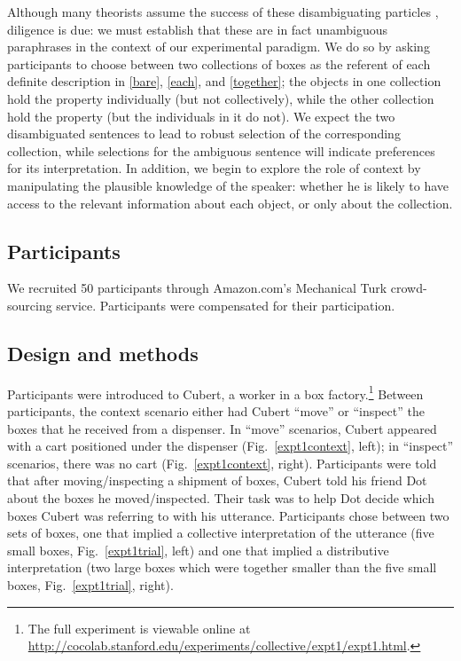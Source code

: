 \documentclass[preprint,12pt,authoryear,titlepage]{elsarticle}
\begin{document}
Although many theorists assume the success of these disambiguating particles \citep[e.g.,][]{schwarzschild1994}, diligence is due: we must establish that these are in fact unambiguous paraphrases in the context of our experimental paradigm. We do so by asking participants to choose between two collections of boxes as the referent of each definite description in \ref{bare}, \ref{each}, and \ref{together}; the objects in one collection hold the property individually (but not collectively), while the other collection hold the property (but the individuals in it do not).
We expect the two disambiguated sentences to lead to robust selection of the corresponding collection, while selections for the ambiguous sentence will indicate preferences for its interpretation.
In addition, we begin to explore the role of context by manipulating the plausible knowledge of the speaker: whether he is likely to have access to the relevant information about each object, or only about the collection.

\subsection{Participants}

We recruited 50 participants through Amazon.com's Mechanical Turk crowd-sourcing service. Participants were compensated for their participation.


\subsection{Design and methods}

Participants were introduced to Cubert, a worker in a box factory.\footnote{The full experiment is viewable online at \url{http://cocolab.stanford.edu/experiments/collective/expt1/expt1.html}.} Between participants, the context scenario either had Cubert ``move'' or ``inspect'' the boxes that he received from a dispenser. In ``move'' scenarios, Cubert appeared with a cart positioned under the dispenser (Fig.~\ref{expt1context}, left); in ``inspect'' scenarios, there was no cart (Fig.~\ref{expt1context}, right). Participants were told that after moving/inspecting a shipment of boxes, Cubert told his friend Dot about the boxes he moved/inspected. Their task was to help Dot decide which boxes Cubert was referring to with his utterance. Participants chose between two sets of boxes, one that implied a collective interpretation of the utterance (five small boxes, Fig.\ \ref{expt1trial}, left) and one that implied a distributive interpretation (two large boxes which were together smaller than the five small boxes, Fig.\ \ref{expt1trial}, right).
\end{document}
